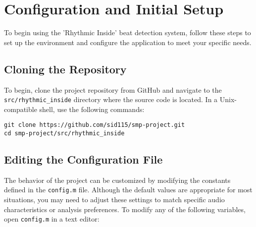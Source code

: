 \section{Configuration and Initial Setup}

To begin using the 'Rhythmic Inside' beat detection system, follow these steps to set up the environment and configure the application to meet your specific needs.

\subsection{Cloning the Repository}

To begin, clone the project repository from GitHub and navigate to the \texttt{src/rhythmic\_inside} directory where the source code is located. In a Unix-compatible shell, use the following commands:

\lstset{style=ShellStyle}
\begin{lstlisting}[caption={Cloning from GitHub}, label=lst]
git clone https://github.com/sid115/smp-project.git
cd smp-project/src/rhythmic_inside
\end{lstlisting}

\subsection{Editing the Configuration File}

The behavior of the project can be customized by modifying the constants defined in the \texttt{config.m} file. Although the default values are appropriate for most situations, you may need to adjust these settings to match specific audio characteristics or analysis preferences. To modify any of the following variables, open \texttt{config.m} in a text editor:

